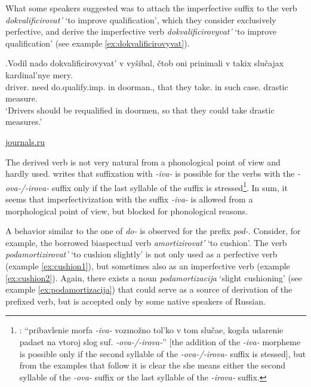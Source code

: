 What some speakers suggested was to attach the imperfective suffix to the verb \textit{dokvalificirovat'} `to improve qualification', which they consider exclusively perfective, and derive the imperfective verb \textit{dokvalificirovyvat'} `to improve qualification' (see example \ref{ex:dokvalificirovyvat}). 

\exg.\label{ex:dokvalificirovyvat}Vodil nado dokvalificirovyvat' v vy\v{s}ibal, \v{c}tob oni prinimali v takix slu\v{c}ajax kardinal'nye mery.\\
driver. need do.qualify.imp. in doorman., that they take. in such case. drastic measure.\\
\vspace{0.5em}
`Drivers should be requalified in doormen, so that they could take drastic measures.'
\begin{flushright}
\vspace{-0.5em}
\url{journals.ru}
\end{flushright}

The derived verb is not very natural from a phonological point of view and hardly used. \citet[590]{Shvedova:82} writes that suffixation with \textit{-iva-} is possible for the verbs with the \textit{-ova-/-irova-} suffix only if the last syllable of the suffix is stressed\footnote{\citet[590]{Shvedova:82}: ``pribavlenie morfa \textit{-­iva-} vozmo\v{z}no tol'ko v tom slu\v{c}ae, kogda udarenie padaet na vtoroj slog suf. \textit{-­ova-/-irova-}'' [the addition of the \textit{-iva-} morpheme is possible only if the second syllable of the \textit{-­ova-/-irova-} suffix is stessed], but from the examples that follow it is clear the she means either the second syllable of the \textit{-ova-} suffix or the last syllable of the \textit{-irova-} suffix.}. In sum, it seems that imperfectivization with the suffix \textit{-iva-} is allowed from a morphological point of view, but blocked for phonological reasons.
 
A behavior similar to the one of \textit{do-} is observed for the prefix \textit{pod-}. Consider, for example, the borrowed biaspectual verb \textit{amortizirovat'} `to cushion'. The verb \textit{podamortizirovat'} `to cushion slightly' is not only used as a perfective verb (example \ref{ex:cushion1}), but sometimes also as an imperfective verb (example \ref{ex:cushion2}). Again, there exists a noun \textit{podamortizacija} `slight cushioning' (see example \ref{ex:podamortizacija}) that could serve as a source of derivation of the prefixed verb, but is accepted only by some native speakers of Russian.

